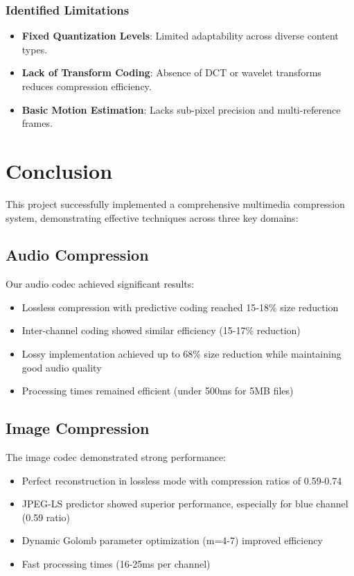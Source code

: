 \documentclass[a4paper,14pt]{article}
\begin{document}
\subsubsection{Identified Limitations}
\begin{itemize}
\item \textbf{Fixed Quantization Levels}: Limited adaptability across diverse content types.
\item \textbf{Lack of Transform Coding}: Absence of DCT or wavelet transforms reduces compression efficiency.
\item \textbf{Basic Motion Estimation}: Lacks sub-pixel precision and multi-reference frames.
\end{itemize}


\section{Conclusion}
This project successfully implemented a comprehensive multimedia compression system, demonstrating effective techniques across three key domains:

\subsection{Audio Compression}
Our audio codec achieved significant results:
\begin{itemize}
    \item Lossless compression with predictive coding reached 15-18\% size reduction
    \item Inter-channel coding showed similar efficiency (15-17\% reduction)
    \item Lossy implementation achieved up to 68\% size reduction while maintaining good audio quality
    \item Processing times remained efficient (under 500ms for 5MB files)
\end{itemize}

\subsection{Image Compression}
The image codec demonstrated strong performance:
\begin{itemize}
    \item Perfect reconstruction in lossless mode with compression ratios of 0.59-0.74
    \item JPEG-LS predictor showed superior performance, especially for blue channel (0.59 ratio)
    \item Dynamic Golomb parameter optimization (m=4-7) improved efficiency
    \item Fast processing times (16-25ms per channel)
\end{itemize}
\end{document}
